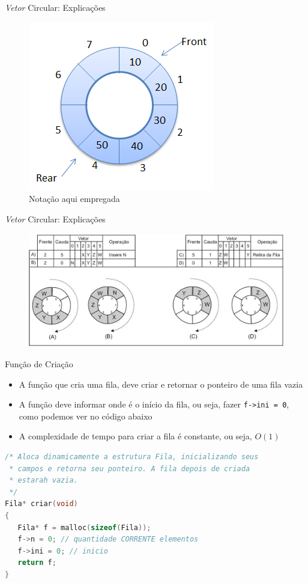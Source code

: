 \begin{frame}{\textit{Vetor} Circular: Explicações}

\begin{figure}[ht!]
			\centering
			\includegraphics[width=.5\textwidth]{figs/fig_filas/fila_circular_simples.png}
		\caption{Notação aqui empregada}
			\end{figure} 
\end{frame}


\begin{frame}{\textit{Vetor} Circular: Explicações}

\begin{figure}[ht!]
	\centering
		\includegraphics[width=.8\textwidth,height=5cm]{figs/fig_filas/fila_circular_explicacao_02.jpg}
			\end{figure} 
\end{frame}


\begin{frame}[fragile]{Função de Criação}
	\begin{itemize}
		\item A função que cria uma fila, deve criar e retornar o ponteiro de uma fila vazia

		\item A função deve informar onde é o início da fila, ou seja, fazer \texttt{f->ini = 0}, 
		como podemos ver no código abaixo
		
		\item A complexidade de tempo para criar a fila é constante, ou seja, $O(1)$
	\end{itemize}
\small	
\begin{lstlisting}[language=C]
/* Aloca dinamicamente a estrutura Fila, inicializando seus
 * campos e retorna seu ponteiro. A fila depois de criada
 * estarah vazia.
 */
Fila* criar(void)
{
   Fila* f = malloc(sizeof(Fila));
   f->n = 0; // quantidade CORRENTE elementos
   f->ini = 0; // inicio
   return f;
}
\end{lstlisting}
\end{frame}

